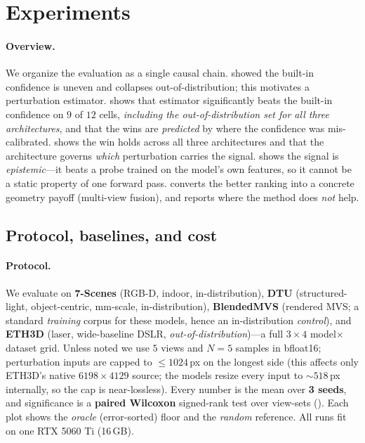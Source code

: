 \section{Experiments}
\label{sec:exp}

\paragraph{Overview.} We organize the evaluation as a single causal chain.  showed the built-in confidence is uneven and
collapses out-of-distribution; this motivates a perturbation estimator.  shows
that estimator significantly beats the built-in confidence on $9$ of $12$ cells, \emph{including the
out-of-distribution set for all three architectures}, and that the wins are \emph{predicted} by where
the confidence was mis-calibrated.  shows the win holds across all three
architectures and that the architecture governs \emph{which} perturbation carries the signal.
 shows the signal is \emph{epistemic}---it beats a probe trained on the model's own
features, so it cannot be a static property of one forward pass.  converts the
better ranking into a concrete geometry payoff (multi-view fusion), and  reports
where the method does \emph{not} help.

\subsection{Protocol, baselines, and cost}
\label{sec:exp-protocol}

\paragraph{Protocol.} We evaluate on \textbf{7-Scenes} (RGB-D, indoor, in-distribution), \textbf{DTU}
(structured-light, object-centric, mm-scale, in-distribution), \textbf{BlendedMVS} (rendered MVS; a
standard \emph{training} corpus for these models, hence an in-distribution \emph{control}), and
\textbf{ETH3D} (laser, wide-baseline DSLR, \emph{out-of-distribution})---a full $3{\times}4$
model$\times$dataset grid. Unless noted we use $5$ views and $N{=}5$ samples in bfloat16;
perturbation inputs are capped to $\le 1024$\,px on the longest side (this affects only ETH3D's native
$6198{\times}4129$ source; the models resize every input to ${\sim}518$\,px internally, so the cap is
near-lossless). Every number is the mean over \textbf{3 seeds}, and significance is a \textbf{paired
Wilcoxon} signed-rank test over view-sets (). Each plot shows the
\emph{oracle} (error-sorted) floor and the \emph{random} reference. All runs fit on one RTX 5060 Ti
(16\,GB).

